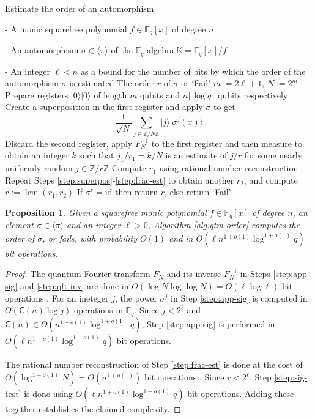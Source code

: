 \documentclass[11pt]{article}
\theoremstyle{plain}
\newtheorem{proposition}[theorem]{Proposition}
\theoremstyle{definition}
\newcommand{\algbox}[1]{
	\begin{tcolorbox}[width = \textwidth, colback = white, arc = 2pt, boxrule = 0.5pt] 
		#1 
	\end{tcolorbox}
}
\newcommand{\lrang}[1]{\langle#1\rangle}
\newcommand{\ldbrac}[1]{\lvert#1\rangle}
\DeclareMathOperator{\lcm}{lcm} %
\def\K{\ensuremath{\mathbb{K}}}
\def\Z{\ensuremath{\mathbb{Z}}}
\def\F{\ensuremath{\mathbb{F}}}
\def\CC{\ensuremath{\mathsf{C}}}
\begin{document}
\begin{algorithm}[t]
	\caption{Estimate the order of an automorphism}
	\label{alg:qtm-order}
	\centering
	\algbox{
	\begin{algorithmic}[1]
		\Require 
		\item[-] A monic squarefree polynomial $f \in \F_q[x]$ of degree $n$
		\item[-] An automorphism $\sigma \in \lrang{\pi}$ of the $\F_q$-algebra $\K = \F_q[x] / f$
		\item[-] An integer $\ell < n$ as a bound for the number of bits by which the order of the 
		automorphism $\sigma$ is estimated
		\Ensure The order $r$ of $\sigma$ or `Fail'
		\State $m := 2\ell + 1$, $N := 2^m$
		\State\label{step:superpos}Prepare registers $\ldbrac{0}\ldbrac{0}$ of length $m$ qubits 
		and $n\lceil \log q \rceil$ qubits respectively
		\State\label{step:app-sig}Create a superposition in the first register and apply $\sigma$ 
		to get
		\[ \frac{1}{\sqrt{N}} \sum_{j \in \Z/N\Z} \ldbrac{j}\ldbrac{\sigma^j(x)} \]
		\State\label{step:qft-inv}Discard the second register, apply $F_N^{-1}$ to the first 
		register and then measure to obtain an integer $k$ such that $j_1 / r_1 = k / N$ is an 
		estimate of $j / r$ for some nearly uniformly random $j \in \Z/r\Z$
		\State\label{step:frac-est}Compute $r_1$ using rational number reconstruction
		\State Repeat Steps \ref{step:superpos}-\ref{step:frac-est} to obtain another $r_2$, 
		and compute $r := \lcm(r_1, r_2)$
		\State\label{step:sig-test} If $\sigma^r = \text{id}$ then return $r$, else return `Fail'
	\end{algorithmic}}
\end{algorithm}
	
\begin{proposition}
	Given a squarefree monic polynomial $f \in \F_q[x]$ of degree $n$, an element $\sigma \in 
	\lrang{\pi}$ and an integer $\ell > 0$, Algorithm \ref{alg:qtm-order} computes the order of 
	$\sigma$, or fails, with probability $O(1)$ and in $O(\ell n^{1 + o(1)}\log^{1 + o(1)}q)$ bit 
	operations.
\end{proposition}
\begin{proof}
	The quantum Fourier transform $F_N$ and its inverse $F_N^{-1}$ in Steps \ref{step:app-sig} 
	and \ref{step:qft-inv} are done in $O(\log N \log\log N) = O(\ell\log\ell)$ bit operations 
	\cite{cleve1998quantum, childs2010quantum}. For an ineteger $j$, the power $\sigma^j$ in Step 
	\ref{step:app-sig} is computed in $O(\CC(n)\log j)$ operations in $\F_q$. Since $j < 2^\ell$ 
	and $\CC(n) \in O(n^{1 + o(1)}\log^{1 + o(1)}q)$, Step \ref{step:app-sig} is performed in 
	$O(\ell n^{1 + o(1)}\log^{1 + o(1)}q)$ bit operations.
	
	The rational number reconstruction of Step \ref{step:frac-est} is done at the cost of 
	$O(\log^{1 + o(1)}N) = O(n^{1 + o(1)})$ bit operations \cite{pan2002acceleration}. Since $r < 
	2^\ell$, Step \ref{step:sig-test} is done using $O(\ell n^{1 + o(1)}\log^{1 + o(1)}q)$ bit 
	operations. Adding these together establishes the claimed complexity.
\end{proof}
\end{document}
